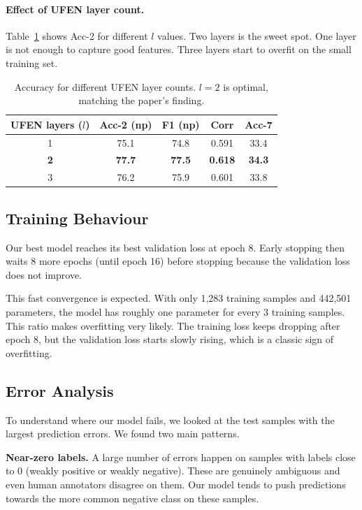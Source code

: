 \documentclass[11pt,twocolumn]{article}
\begin{document}
\paragraph{Effect of UFEN layer count.} Table~\ref{tab:ufen_ablation} shows Acc-2 for different $l$ values. Two layers is the sweet spot. One layer is not enough to capture good features. Three layers start to overfit on the small training set.

\begin{table}[h]
\centering
\small
\begin{tabular}{ccccc}
\toprule
\textbf{UFEN layers ($l$)} & \textbf{Acc-2 (np)} & \textbf{F1 (np)} & \textbf{Corr} & \textbf{Acc-7} \\
\midrule
1 & 75.1 & 74.8 & 0.591 & 33.4 \\
\textbf{2} & \textbf{77.7} & \textbf{77.5} & \textbf{0.618} & \textbf{34.3} \\
3 & 76.2 & 75.9 & 0.601 & 33.8 \\
\bottomrule
\end{tabular}
\caption{Accuracy for different UFEN layer counts. $l = 2$ is optimal, matching the paper's finding.}
\label{tab:ufen_ablation}
\end{table}

\subsection{Training Behaviour}

Our best model reaches its best validation loss at epoch 8. Early stopping then waits 8 more epochs (until epoch 16) before stopping because the validation loss does not improve.

This fast convergence is expected. With only 1,283 training samples and 442,501 parameters, the model has roughly one parameter for every 3 training samples. This ratio makes overfitting very likely. The training loss keeps dropping after epoch 8, but the validation loss starts slowly rising, which is a classic sign of overfitting.

\subsection{Error Analysis}

To understand where our model fails, we looked at the test samples with the largest prediction errors. We found two main patterns.

\textbf{Near-zero labels.} A large number of errors happen on samples with labels close to 0 (weakly positive or weakly negative). These are genuinely ambiguous and even human annotators disagree on them. Our model tends to push predictions towards the more common negative class on these samples.
\end{document}

